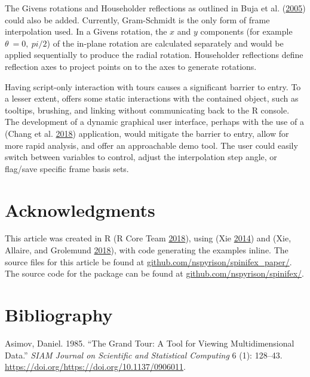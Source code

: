 The Givens rotations and Householder reflections as outlined in Buja et
al. (\protect\hyperlink{ref-buja_computational_2005}{2005}) could also
be added. Currently, Gram-Schmidt is the only form of frame
interpolation used. In a Givens rotation, the \(x\) and \(y\) components
(for example \(\theta~= 0,~pi/2\)) of the in-plane rotation are
calculated separately and would be applied sequentially to produce the
radial rotation. Householder reflections define reflection axes to
project points on to the axes to generate rotations.

Having script-only interaction with tours causes a significant barrier
to entry. To a lesser extent,  offers some static
interactions with the contained object, such as tooltips, brushing, and
linking without communicating back to the R console. The development of
a dynamic graphical user interface, perhaps with the use of a
 (Chang et al.
\protect\hyperlink{ref-chang_shiny:_2018}{2018}) application, would
mitigate the barrier to entry, allow for more rapid analysis, and offer
an approachable demo tool. The user could easily switch between
variables to control, adjust the interpolation step angle, or flag/save
specific frame basis sets.

\hypertarget{acknowledgments}{%
\section{Acknowledgments}\label{acknowledgments}}

This article was created in R (R Core Team
\protect\hyperlink{ref-r_core_team_r:_2018}{2018}), using
 (Xie \protect\hyperlink{ref-stodden_knitr:_2014}{2014})
and  (Xie, Allaire, and Grolemund
\protect\hyperlink{ref-xie_r_2018}{2018}), with code generating the
examples inline. The source files for this article be found at
\href{https://github.com/nspyrison/spinifex_paper/}{github.com/nspyrison/spinifex\_paper/}.
The source code for the  package can be found at
\href{https://github.com/nspyrison/spinifex/}{github.com/nspyrison/spinifex/}.

\hypertarget{bibliography}{%
\section*{Bibliography}\label{bibliography}}

\hypertarget{refs}{}
\leavevmode\hypertarget{ref-asimov_grand_1985}{}%
Asimov, Daniel. 1985. ``The Grand Tour: A Tool for Viewing
Multidimensional Data.'' \emph{SIAM Journal on Scientific and
Statistical Computing} 6 (1): 128--43.
\url{https://doi.org/https://doi.org/10.1137/0906011}.

